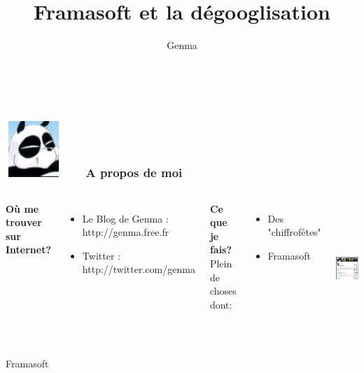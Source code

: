 \documentclass{beamer}
\title[Framasoft et la dégooglisation]{Framasoft et la dégooglisation}
\author{Genma}
\begin{document}
\begin{frame}
	\titlepage
	\vfill
	\begin{center}
		\\[2.5ex]
		{\tiny\CcNote{\CcLongnameByNcSa}}
		\vspace*{-2.5ex}
	\end{center}
\end{frame}



\begin{frame}
\frametitle{\includegraphics[scale=0.4]{./images/Genma.jpg} \ \ \  A propos de moi  }
\begin{columns}[c] 

\textbf{Où me trouver sur Internet?}
\begin{itemize}
\item Le Blog de Genma : http://genma.free.fr
\item Twitter : http://twitter.com/genma
\end{itemize}

\textbf{Ce que je fais?}
\\ Plein de choses dont:
\begin{itemize}
\item Des "chiffrofêtes"
\item Framasoft
\end{itemize}

\includegraphics[width=5cm,height=5cm]{./images/blog.png} 
\end{columns}
\end{frame}

\begin{frame}
\Huge{\centerline{Framasoft}}
\end{frame}
\end{document}
